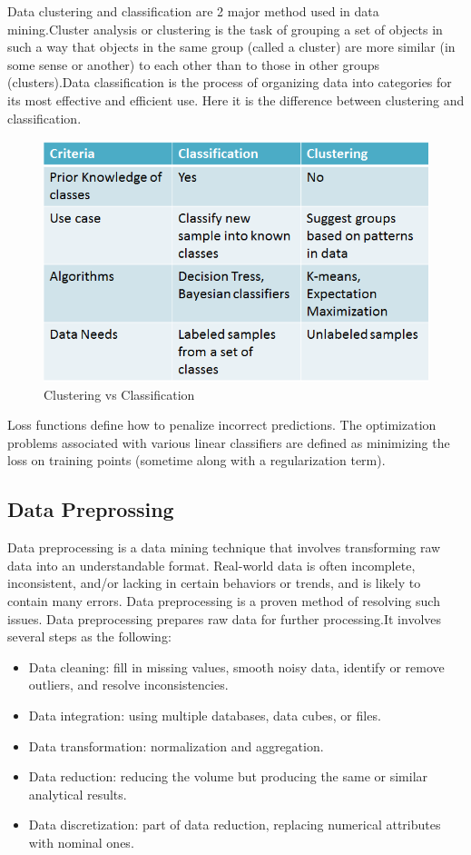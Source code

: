 \documentclass[fleqn,10pt]{SelfArx} %
\begin{document}
Data clustering and classification are 2 major method used in data mining.Cluster analysis or clustering is the task of grouping a set of objects in such a way that objects in the same group (called a cluster) are more similar (in some sense or another) to each other than to those in other groups (clusters).Data classification is the process of organizing data into categories for its most effective and efficient use. Here it is the difference between clustering and classification.
\begin{figure}[ht]\centering
\includegraphics[width=\linewidth]{classification}
\caption{Clustering vs Classification}
\label{fig:classification}
\end{figure}

Loss functions define how to penalize incorrect predictions. The optimization problems associated with various linear classifiers are defined as minimizing the loss on training points (sometime along with a regularization term).


\subsection{Data Preprossing}

Data preprocessing is a data mining technique that involves transforming raw data into an understandable format. Real-world data is often incomplete, inconsistent, and/or lacking in certain behaviors or trends, and is likely to contain many errors. Data preprocessing is a proven method of resolving such issues. Data preprocessing prepares raw data for further processing.It involves several steps as the following:
\begin{itemize}[noitemsep]
\item Data cleaning: fill in missing values, smooth noisy data, identify or remove outliers, and resolve inconsistencies.
\item Data integration: using multiple databases, data cubes, or files.
\item Data transformation: normalization and aggregation.
\item Data reduction: reducing the volume but producing the same or similar analytical results.
\item Data discretization: part of data reduction, replacing numerical attributes with nominal ones.
\end{itemize}
\end{document}

